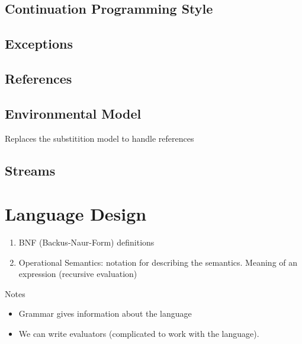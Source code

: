 \documentclass[10pt,twoside]{article}
\begin{document}
\subsection{Continuation Programming Style}
\subsection{Exceptions}
\subsection{References}
\subsection{Environmental Model}
Replaces the substitition model to handle references
\subsection{Streams}

\section{Language Design}

\begin{enumerate}
\item BNF (Backus-Naur-Form) definitions
\item Operational Semantics: notation for describing the semantics. Meaning of an expression (recursive evaluation)
\end{enumerate}

Notes
\begin{itemize}
\item Grammar gives information about the language
\item We can write evaluators (complicated to work with the language). 
\end{itemize}
\end{document}
